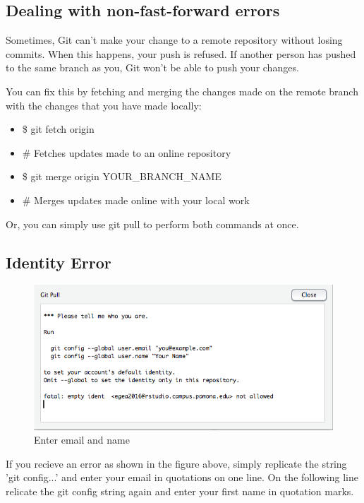 \documentclass[12pt]{../SOP3_beta}
\begin{document}
\subsection{Dealing with non-fast-forward errors}

\NP Sometimes, Git can't make your change to a remote repository without losing commits. When this happens, your push is refused. If another person has pushed to the same branch as you, Git won't be able to push your changes.

\NP You can fix this by fetching and merging the changes made on the remote branch with the changes that you have made locally:
\begin{itemize}
  \item \$ git fetch origin
  \item \# Fetches updates made to an online repository
  \item \$ git merge origin YOUR\_BRANCH\_NAME
  \item \# Merges updates made online with your local work
\end{itemize}

\NP Or, you can simply use git pull to perform both commands at once.

\subsection {Identity Error}
\begin{figure}[H]
\includegraphics{graphics/IdentityError.png}
\caption{Enter email and name}
\end{figure}

\NP If you recieve an error as shown in the figure above, simply replicate the string 'git config...' and enter your email in quotations on one line. On the following line relicate the git config string again and enter your first name in quotation marks. 
\end{document}
